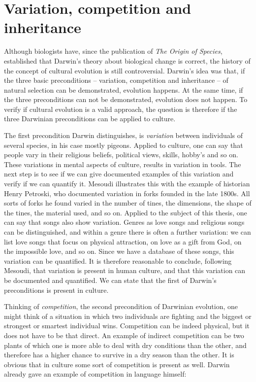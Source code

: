 \section{Variation, competition and inheritance}
Although biologists have, since the publication of \textit{The Origin of Species}, established that Darwin's theory about biological change is correct, the history of the concept of cultural evolution is still controversial. Darwin's idea was that, if the three basic preconditions -- variation, competition and inheritance -- of natural selection can be demonstrated, evolution happens. At the same time, if the three preconditions can not be demonstrated, evolution does not happen. To verify if cultural evolution is a valid approach, the question is therefore if the three Darwinian preconditions can be applied to culture.

The first precondition Darwin distinguishes, is \textit{variation} between individuals of several species, in his case mostly pigeons. Applied to culture, one can say that people vary in their religious beliefs, political views, skills, hobby's and so on. These variations in mental aspects of culture, results in variation in tools. The next step is to see if we can give documented examples of this variation and verify if we can quantify it. Mesoudi illustrates this with the example of historian Henry Petroski, who documented variation in forks founded in the late 1800s. All sorts of forks he found varied in the number of tines, the dimensions, the shape of the tines, the material used, and so on.\autocite[28]{mesoudi_cultural_2011} Applied to the subject of this thesis, one can say that songs also show variation. Genres as love songs and religious songs can be distinguished, and within a genre there is often a further variation: we can list love songs that focus on physical attraction, on love as a gift from God, on the impossible love, and so on. Since we have a database of these songs, this variation can be quantified. It is therefore reasonable to conclude, following Mesoudi, that variation is present in human culture, and that this variation can be documented and quantified. We can state that the first of Darwin's preconditions is present in culture.\autocite[29]{mesoudi_cultural_2011}

Thinking of \textit{competition}, the second precondition of Darwinian evolution, one might think of a situation in which two individuals are fighting and the biggest or strongest or smartest individual wins. Competition can be indeed physical, but it does not have to be that direct. An example of indirect competition can be two plants of which one is more able to deal with dry conditions than the other, and therefore has a higher chance to survive in a dry season than the other.\autocite[30]{mesoudi_cultural_2011} It is obvious that in culture some sort of competition is present as well. Darwin already gave an example of competition in language himself:

